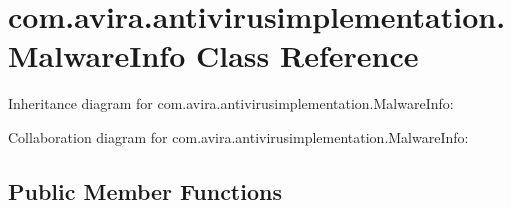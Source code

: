 \hypertarget{classcom_1_1avira_1_1antivirusimplementation_1_1_malware_info}{}\section{com.\+avira.\+antivirusimplementation.\+Malware\+Info Class Reference}
\label{classcom_1_1avira_1_1antivirusimplementation_1_1_malware_info}


Inheritance diagram for com.\+avira.\+antivirusimplementation.\+Malware\+Info\+:


Collaboration diagram for com.\+avira.\+antivirusimplementation.\+Malware\+Info\+:
\subsection*{Public Member Functions}
